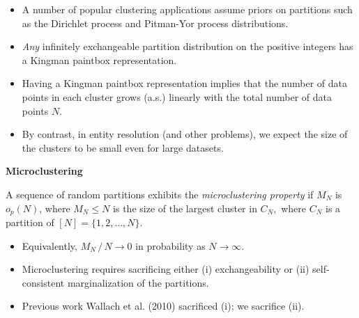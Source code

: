\documentclass[portrait,a0b,final]{a0poster}
\newenvironment{poster}{
  \begin{center}
  \begin{minipage}[c]{0.98\textwidth}
}{
  \end{minipage}
  \end{center}
}
\newcommand{\mycaption}[1]{
  \vspace{0.25cm}
  \begin{quote}
    {{\sc Figure} \arabic{figure}: #1}
  \end{quote}
  \vspace{0.25cm}
  \stepcounter{figure}
}
\begin{document}
\begin{poster}
\begin{multicols}{3}
\begin{itemize}
\item A number of popular clustering applications assume priors on partitions such as the Dirichlet process and Pitman-Yor process distributions.
\item \emph{Any} infinitely exchangeable partition distribution on the positive integers has a Kingman paintbox representation.
\item Having a Kingman paintbox representation implies that the number of data points in each cluster grows (a.s.) linearly with the total number of data points $N$.
\item By contrast, in entity resolution (and other problems), we expect the size of the clusters to be small even for large datasets.
\end{itemize}

\vspace*{1em}

\begin{center}
\textbf{Microclustering}
\end{center}
A sequence of random partitions exhibits the \emph{microclustering property} if $M_N$ is $o_p(N)$, where $M_N \leq N$ is the size of the largest cluster in $C_N,$ where $C_N$ is a partition of $[N] = \{1,2, \ldots, N\}.$

\begin{itemize}
\item Equivalently, $M_N \,/\, N \rightarrow 0$ in probability as $N \rightarrow \infty$.
\item Microclustering requires sacrificing either (i) exchangeability or (ii) self-consistent marginalization of the partitions. 
\item Previous work Wallach et al. (2010) sacrificed (i); we sacrifice (ii).
\end{itemize}



\end{multicols}
\end{poster}
\end{document}
